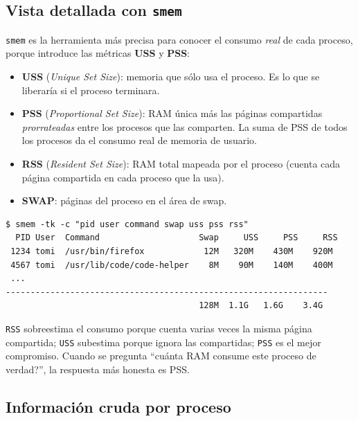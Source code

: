 \documentclass[11pt,a4paper]{article}
\begin{document}
\subsection{Vista detallada con \texttt{smem}}

\texttt{smem} es la herramienta más precisa para conocer el consumo
\emph{real} de cada proceso, porque introduce las métricas
\textbf{USS} y \textbf{PSS}:

\begin{itemize}[leftmargin=*]
    \item \textbf{USS} (\emph{Unique Set Size}): memoria que sólo
        usa el proceso. Es lo que se liberaría si el proceso terminara.
    \item \textbf{PSS} (\emph{Proportional Set Size}): RAM única más
        las páginas compartidas \emph{prorrateadas} entre los procesos
        que las comparten. La suma de PSS de todos los procesos da el
        consumo real de memoria de usuario.
    \item \textbf{RSS} (\emph{Resident Set Size}): RAM total mapeada
        por el proceso (cuenta cada página compartida en cada proceso
        que la usa).
    \item \textbf{SWAP}: páginas del proceso en el área de swap.
\end{itemize}

\begin{lstlisting}[style=shellstyle]
$ smem -tk -c "pid user command swap uss pss rss"
  PID User  Command                    Swap     USS     PSS     RSS
 1234 tomi  /usr/bin/firefox            12M   320M    430M    920M
 4567 tomi  /usr/lib/code/code-helper    8M    90M    140M    400M
 ...
-----------------------------------------------------------------
                                       128M  1.1G   1.6G    3.4G
\end{lstlisting}

\begin{idea}
\texttt{RSS} sobreestima el consumo porque cuenta varias veces la
misma página compartida; \texttt{USS} subestima porque ignora las
compartidas; \texttt{PSS} es el mejor compromiso. Cuando se pregunta
``\textquestiondown{}cuánta RAM consume este proceso de verdad?'', la respuesta más
honesta es PSS.
\end{idea}

\subsection{Información cruda por proceso}
\end{document}
